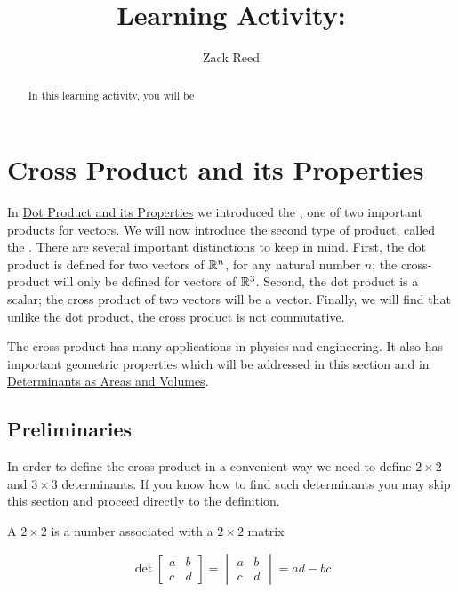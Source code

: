 \documentclass{ximera}
\author{Zack Reed}
\title{Learning Activity: }
\begin{document}
\begin{abstract}

    In this learning activity, you will be 
\end{abstract}
\maketitle

\section*{Cross Product and its Properties}
In \href{https://ximera.osu.edu/oerlinalg/LinearAlgebra/VEC-0050/main}{Dot Product and its Properties} we introduced the , one of two important products for vectors.  We will now introduce the second type of product, called the .  There are several important distinctions to keep in mind.  First, the dot product is defined for two vectors of $\mathbb{R}^n$, for any  natural number $n$; the cross-product will only be defined for vectors of $\mathbb{R}^3$.  Second, the dot product is a scalar; the cross product of two vectors will be a vector.  Finally, we will find that unlike the dot product, the cross product is not commutative. 
 
The cross product has many applications in physics and engineering.  It also has important geometric properties which will be addressed in this section and in \href{https://ximera.osu.edu/oerlinalg/LinearAlgebra/DET-0070/main}{Determinants as Areas and Volumes}.
 
\subsection*{Preliminaries}
In order to define the cross product in a convenient way we need to define $2\times 2$ and $3\times 3$ determinants.  If you know how to find such determinants you may skip this section and proceed directly to the definition.
 
\begin{definition}\label{def:twodetcrossprod}
A $2\times 2$  is a number associated with a $2\times 2$ matrix
 
$$\det{\begin{bmatrix}
a & b\\
c & d
\end{bmatrix}}=\begin{vmatrix}
a & b\\
c & d
\end{vmatrix} =ad-bc$$
 
\end{definition}
 
\end{document}
